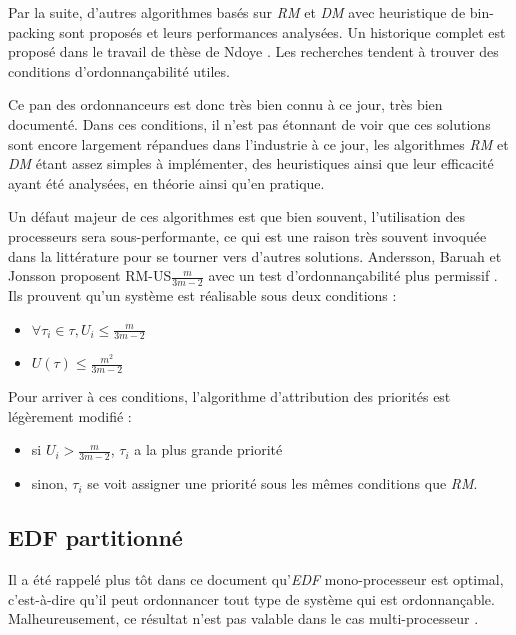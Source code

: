 \documentclass[11pt,a4paper,oneside]{report}
\begin{document}
	Par la suite, d'autres algorithmes basés sur \textit{RM} et \textit{DM} avec 
	heuristique de bin-packing sont proposés et leurs performances analysées. 
	Un historique complet est proposé dans le travail de thèse de Ndoye \cite{ndoye_ordonnancement_2014}. 
	Les recherches tendent à trouver des conditions d'ordonnançabilité utiles.\medskip
	
	Ce pan des ordonnanceurs est donc très bien connu à ce jour, très bien documenté. 
	Dans ces conditions, il n'est pas étonnant de voir que ces solutions sont encore largement 
	répandues dans l'industrie à ce jour, les algorithmes \textit{RM} et \textit{DM} 
	étant assez simples à implémenter, des heuristiques ainsi que leur efficacité ayant été analysées, en théorie ainsi qu'en pratique.\medskip
	
	Un défaut majeur de ces algorithmes est que bien souvent, l'utilisation des processeurs sera 
	sous-performante, ce qui est une raison très souvent invoquée dans la littérature pour se 
	tourner vers d'autres solutions. 
	Andersson, Baruah et Jonsson proposent RM-US$\frac{m}{3m-2}$ avec un test 
	d'ordonnançabilité plus permissif \cite{andersson_static-priority_2001}. Ils prouvent 
	qu'un système est réalisable sous deux conditions :\medskip
	\begin{itemize}
		\item $\forall \tau_i \in \tau, U_i \leq \frac{m}{3m-2}$
		\item $U(\tau) \leq \frac{m^2}{3m-2}$ 
	\end{itemize}
	\vspace{1em}
	Pour arriver à ces conditions, l'algorithme d'attribution des priorités est légèrement modifié : \medskip
	\begin{itemize}
		\item si $U_i > \frac{m}{3m-2}$, $\tau_i$ a la plus grande priorité
		\item sinon, $\tau_i$ se voit assigner une priorité sous les mêmes conditions que \textit{RM}.
	\end{itemize}
	
	
	\subsection{EDF partitionné}
	Il a été rappelé plus tôt dans ce document qu'\textit{EDF} mono-processeur est optimal, 
	c'est-à-dire qu'il peut ordonnancer tout type de système qui est ordonnançable. 
	Malheureusement, ce résultat n'est pas valable dans le cas multi-processeur \cite{dertouzos_multiprocessor_1989}.\medskip
	
\end{document}
